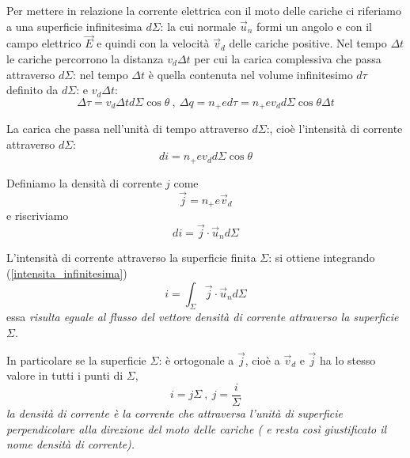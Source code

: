 \documentclass[class=book, crop=false, oneside, 12pt]{standalone}
\begin{document}
Per mettere in relazione la corrente elettrica con il moto delle cariche ci riferiamo a una superficie infinitesima \(d\Sigma\): la cui normale \(\overrightarrow{u}_n\) formi un angolo e con il campo elettrico \(\overrightarrow{E}\) e quindi con la velocità \(\overrightarrow{v}_d\) delle cariche positive. 
Nel tempo \(\Delta t\) le cariche percorrono la distanza \(v_d \Delta t\) per cui la carica complessiva che passa attraverso \(d\Sigma\): nel tempo \(\Delta t\) è quella contenuta nel volume infinitesimo \(d \tau\) definito da \(d \Sigma\): e \(v_d \Delta t\):
\begin{equation*}
    \Delta \tau = v_d \Delta t d \Sigma \cos \theta \ , \ \Delta q = n_{+} e d \tau = n_{+} e v_d d \Sigma \cos \theta \Delta t
\end{equation*}

La carica che passa nell'unità di tempo attraverso \(d \Sigma\):, cioè l'intensità di corrente attraverso \(d \Sigma\):
\begin{equation*}
    di = n_{+} e v_d d \Sigma \cos \theta
\end{equation*}

Definiamo la densità di corrente \(j\) come
\begin{equation}
    \overrightarrow{j} = n_{+} e \overrightarrow{v}_d
\end{equation}
e riscriviamo 
\begin{equation} \label{intensita_infinitesima}
    di = \overrightarrow{j} \cdot \overrightarrow{u}_n d \Sigma
\end{equation}

L'intensità di corrente attraverso la superficie finita \(\Sigma\): si ottiene integrando (\ref{intensita_infinitesima})
\begin{equation} \label{intensita_di_corrente}
    i = \int_{\Sigma} \overrightarrow{j} \cdot \overrightarrow{u}_n d \Sigma
\end{equation}
essa \emph{risulta eguale al flusso del vettore densità di corrente attraverso la superficie} \(\Sigma\).

In particolare se la superficie \(\Sigma\): è ortogonale a \(\overrightarrow{j}\), cioè a \(\overrightarrow{v}_d\) e \(\overrightarrow{j}\) ha lo stesso valore in tutti i punti di \(\Sigma\),
\begin{equation}
    i = j \Sigma \ , \ j = \frac{i}{\Sigma}
\end{equation}
\emph{la densità di corrente è la corrente che attraversa l'unità di superficie perpendicolare alla direzione del moto delle cariche ( e resta così giustificato il nome densità di corrente). }
\end{document}
